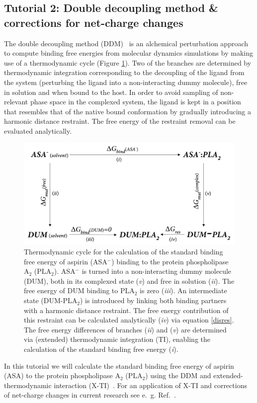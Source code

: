 
\subsection{Tutorial 2: Double decoupling method \& corrections for net-charge changes} \label{chap:tut2}
The double decoupling method (DDM)~\cite{DDM} is an alchemical perturbation approach to compute binding free energies from molecular dynamics simulations by making use of a thermodynamic cycle (Figure \ref{TC_ASA}). Two of the branches are determined by thermodynamic integration corresponding to the decoupling of the ligand from the system (perturbing the ligand into a non-interacting dummy molecule), free in solution and when bound to the host. In order to avoid sampling of non-relevant phase space in the complexed system, the ligand is kept in a position that resembles that of the native bound conformation by gradually introducing a harmonic distance restraint. The free energy of the restraint removal can be evaluated analytically.

\begin{figure}[H]
    \centering
    \includegraphics[scale=0.21]{../05_tutorial_02/figures/TC_ASA.png}
    \caption{Thermodynamic cycle for the calculation of the standard binding free energy of aspirin (ASA$^-$) binding to the protein phospholipase A$_2$ (PLA$_2$). ASA$^-$ is turned into a non-interacting dummy molecule (DUM), both in its complexed state (\textit{v}) and free in solution (\textit{ii}). The free energy of DUM binding to PLA$_2$ is zero (\textit{iii}). An intermediate state (DUM-PLA$_2$) is introduced by linking both binding partners with a harmonic distance restraint. The free energy contribution of this restraint can be calculated analytically (\textit{iv}) via equation \ref{disres}. The free energy differences of branches (\textit{ii}) and (\textit{v}) are determined via (extended) thermodynamic integration (TI), enabling the calculation of the standard binding free energy (\textit{i}).}
    \label{TC_ASA}
\end{figure}
%
In this tutorial we will calculate the standard binding free energy of aspirin (ASA) to the protein phospholipase A$_2$ (PLA$_2$) using the DDM and extended-thermodynamic interaction (X-TI)~\cite{X_TI}. 
For an application of X-TI and corrections of net-charge changes in current research see e.~g. Ref.~\cite{Ohlknecht_2020b}.

